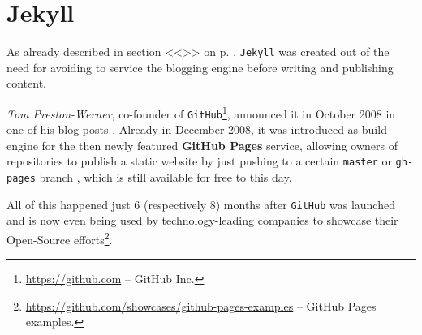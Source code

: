 \section{Jekyll}
\label{sec:jekyll}

As already described in section <<\emph{}>> on p. \pageref{par:creatingcontent}, \texttt{Jekyll} was created out of the need for avoiding to service the blogging engine before writing and publishing content.

\emph{Tom Preston-Werner}, co-founder of \texttt{GitHub}\footnote{\url{https://github.com} -- GitHub Inc.}, announced it in October 2008 in one of his blog posts \cite{PrestonWerner2008jekyll}. Already in December 2008, it was introduced as build engine for the then newly featured \textbf{GitHub Pages} service, allowing owners of repositories to publish a static website by just pushing to a certain \texttt{master} or \texttt{gh-pages} branch \cite{PrestonWerner2008githubpages}, which is still available for free to this day.

All of this happened just 6 (respectively 8) months after \texttt{GitHub} was launched \cite{PrestonWerner2008githublaunch} and is now even being used by technology-leading companies to showcase their Open-Source efforts\footnote{\url{https://github.com/showcases/github-pages-examples} -- GitHub Pages examples.}.
